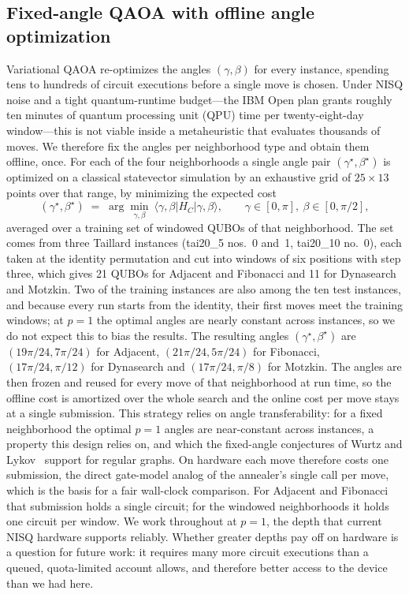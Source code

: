\documentclass{svproc}
\newcommand{\rev}[1]{{\color{blue}#1}}
\newcommand{\rev}[1]{#1}
\begin{document}
\subsection{Fixed-angle QAOA with offline angle optimization}
\label{subsec:fixed}
Variational QAOA re-optimizes the angles $(\gamma,\beta)$ for every
instance, spending tens to hundreds of circuit executions before a single
move is chosen. Under NISQ noise and a tight quantum-runtime budget---the
IBM Open plan grants roughly ten minutes of \rev{quantum processing unit (QPU)} time per twenty-eight-day
window---this is not viable inside a metaheuristic that evaluates
thousands of moves. We therefore fix the angles per neighborhood type and
obtain them offline, once. For each of the four neighborhoods a single
angle pair $(\gamma^\star,\beta^\star)$ is optimized on a classical
statevector simulation by an exhaustive \rev{grid of $25\times13$ points} over that
range, by minimizing the expected cost
\begin{equation}
  (\gamma^\star,\beta^\star)
  \;=\; \arg\min_{\gamma,\beta}\
  \langle\gamma,\beta\lvert H_C\rvert\gamma,\beta\rangle,
  \qquad \gamma\in[0,\pi],\ \beta\in[0,\pi/2],
  \label{eq:angleopt}
\end{equation}
averaged over a \rev{training set of windowed QUBOs of that neighborhood. The set
comes from three Taillard instances (tai20\_5 nos.~0 and~1, tai20\_10 no.~0),
each taken at the identity permutation and cut into windows of six positions
with step three, which gives 21 QUBOs for Adjacent and Fibonacci and 11 for
Dynasearch and Motzkin. Two of the training instances are also among the ten
test instances, and because every run starts from the identity, their first
moves meet the training windows; at $p=1$ the optimal angles are nearly constant
across instances, so we do not expect this to bias the results. The resulting
angles $(\gamma^\star,\beta^\star)$ are $(19\pi/24,7\pi/24)$ for Adjacent,
$(21\pi/24,5\pi/24)$ for Fibonacci, $(17\pi/24,\pi/12)$ for Dynasearch and
$(17\pi/24,\pi/8)$ for Motzkin.} The angles are then frozen and reused for every move
of that neighborhood at run time, so the offline cost is amortized over
the whole search and the online cost per move stays at a single
submission. This strategy relies on angle transferability: for a fixed
neighborhood the optimal $p=1$ angles are near-constant across instances,
a property this design relies on\rev{, and which the fixed-angle conjectures of
Wurtz and Lykov~\cite{wurtz2021fixed} support for regular graphs}. On hardware each move therefore costs one
submission, the direct gate-model analog of the annealer's single
call per move, which is the basis for a fair wall-clock comparison. For
Adjacent and Fibonacci that submission holds a single circuit; for the
windowed neighborhoods it holds one circuit per window. We
work throughout at $p=1$, the depth that current NISQ hardware supports
reliably. Whether greater depths pay off on hardware is a question for future
work: it requires many more circuit executions than a queued, quota-limited
account allows, and therefore better access to the device than we had here.
\end{document}
